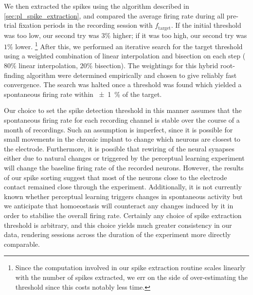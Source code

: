 We then extracted the spikes using the algorithm described in \autoref{sec:pl_spike_extraction}, and compared the average firing rate during all pre-trial fixation periods in the recording session with $f_\text{target}$.
If the initial threshold was too low, our second try was $3\%$ higher; if it was too high, our second try was $1\%$ lower.%
\footnote{Since the computation involved in our spike extraction routine scales linearly with the number of spikes extracted, we err on the side of over-estimating the threshold since this costs notably less time.}
After this, we performed an iterative search for the target threshold using a weighted combination of linear interpolation and bisection on each step ($80\%$ linear interpolation, $20\%$ bisection).
The weightings for this hybrid root-finding algorithm were determined empirically and chosen to give reliably fast convergence.
The search was halted once a threshold was found which yielded a spontaneous firing rate within \SI{\pm1}{\percent} of the target.

Our choice to set the spike detection threshold in this manner assumes that the spontaneous firing rate for each recording channel is stable over the course of a month of recordings.
Such an assumption is imperfect, since it is possible for small movements in the chronic implant to change which neurons are closest to the electrode.
Furthermore, it is possible that rewiring of the neural synapses either due to natural changes or triggered by the perceptual learning experiment will change the baseline firing rate of the recorded neurons.
However, the results of our spike sorting suggest that most of the neurons close to the electrode contact remained close through the experiment.
Additionally, it is not currently known whether perceptual learning triggers changes in spontaneous activity but we anticipate that homoeostasis will counteract any changes induced by it in order to stabilise the overall firing rate.
Certainly any choice of spike extraction threshold is arbitrary, and this choice yields much greater consistency in our data, rendering sessions across the duration of the experiment more directly comparable.
